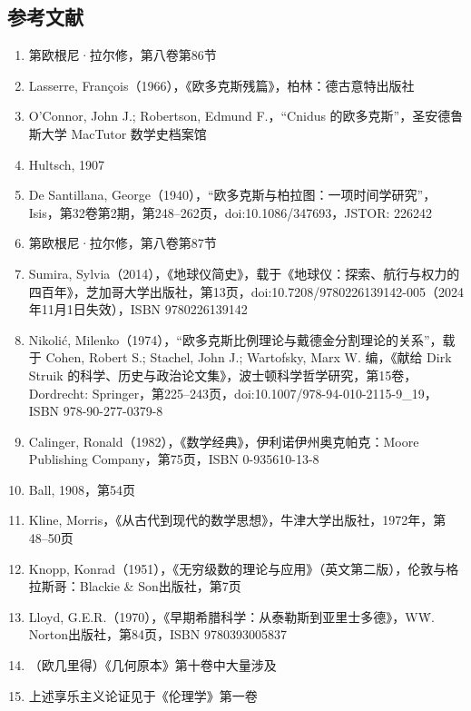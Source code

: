 \subsection{参考文献}
\begin{enumerate}
\item 第欧根尼·拉尔修，第八卷第86节
\item Lasserre, François（1966），《欧多克斯残篇》，柏林：德古意特出版社
\item O'Connor, John J.; Robertson, Edmund F.，“Cnidus 的欧多克斯”，圣安德鲁斯大学 MacTutor 数学史档案馆
\item Hultsch, 1907
\item De Santillana, George（1940），“欧多克斯与柏拉图：一项时间学研究”，Isis，第32卷第2期，第248–262页，doi:10.1086/347693，JSTOR: 226242
\item 第欧根尼·拉尔修，第八卷第87节
\item Sumira, Sylvia（2014），《地球仪简史》，载于《地球仪：探索、航行与权力的四百年》，芝加哥大学出版社，第13页，doi:10.7208/9780226139142-005（2024年11月1日失效），ISBN 9780226139142
\item Nikolić, Milenko（1974），“欧多克斯比例理论与戴德金分割理论的关系”，载于 Cohen, Robert S.; Stachel, John J.; Wartofsky, Marx W. 编，《献给 Dirk Struik 的科学、历史与政治论文集》，波士顿科学哲学研究，第15卷，Dordrecht: Springer，第225–243页，doi:10.1007/978-94-010-2115-9\_19，ISBN 978-90-277-0379-8
\item Calinger, Ronald（1982），《数学经典》，伊利诺伊州奥克帕克：Moore Publishing Company，第75页，ISBN 0-935610-13-8
\item Ball, 1908，第54页
\item Kline, Morris，《从古代到现代的数学思想》，牛津大学出版社，1972年，第48–50页
\item Knopp, Konrad（1951），《无穷级数的理论与应用》（英文第二版），伦敦与格拉斯哥：Blackie & Son出版社，第7页
\item Lloyd, G.E.R.（1970），《早期希腊科学：从泰勒斯到亚里士多德》，W\.W. Norton出版社，第84页，ISBN 9780393005837
\item （欧几里得）《几何原本》第十卷中大量涉及
\item 上述享乐主义论证见于《伦理学》第一卷
\end{enumerate}
